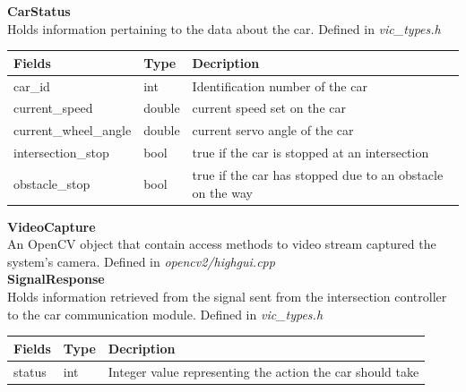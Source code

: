 \documentclass [10pt]{article}
\begin{document}
\textbf{CarStatus}\\
\indent \indent Holds information pertaining to the data about the car. Defined in \textit{vic\_types.h} \\


\begin{longtable}{ |p{ }  | p{ }| p{ } |} \hline
    \textbf{Fields} & \textbf{Type}  & \textbf{Decription}\\ \hline
    \rowcolor{tableCell}car\_id & int & Identification number of the car \\ \hline
    current\_speed & double & current speed set on the car \\ \hline
    \rowcolor{tableCell}current\_wheel\_angle & double & current servo angle of the car \\ \hline
    intersection\_stop & bool & true if the car is stopped at an intersection  \\ \hline
    \rowcolor{tableCell}obstacle\_stop & bool & true if the car has stopped due to an obstacle on the way\\ \hline
\end{longtable}


\textbf{VideoCapture}\\
\indent \indent An OpenCV object that contain access methods to video stream captured the system's camera. Defined in \textit{opencv2/highgui.cpp}\\





\textbf{SignalResponse}\\
\indent \indent Holds information retrieved from the signal sent from the intersection controller to the car communication module. Defined in \textit{vic\_types.h}\\

\begin{longtable}{ |p{ }  | p{ }| p{ } |} \hline
    \textbf{Fields} & \textbf{Type}  & \textbf{Decription}\\ \hline
    \rowcolor{tableCell}status & int & Integer value representing the action the car should take \\ \hline
\end{longtable}
\end{document}
